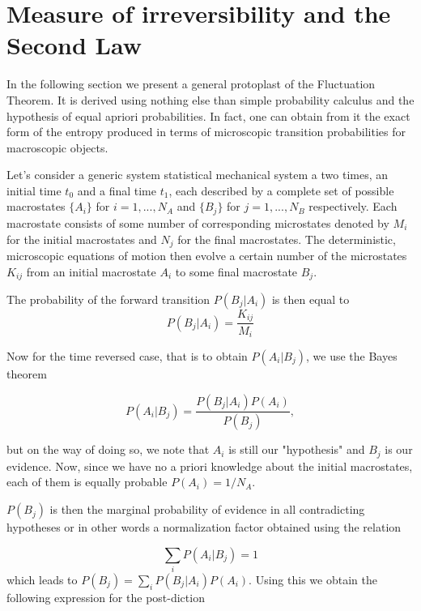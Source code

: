 \documentclass[a4paper,12pt]{article}
\begin{document}
\section{Measure of irreversibility and the Second Law}

In the following section we present a general protoplast of the Fluctuation Theorem. It is derived using nothing else than simple probability calculus and the hypothesis of equal apriori probabilities.
In fact, one can obtain from it the exact form of the entropy produced in terms of microscopic transition probabilities for macroscopic objects.

Let's consider a generic system statistical mechanical system a two times, an initial time $t_0$ and a final time $t_1$, each described by a complete set of possible macrostates $\{A_i\}$ for $ i=1,...,N_A $ and $\{B_j\}$ for $ j=1,...,N_B $  respectively. Each macrostate consists of some number of corresponding microstates denoted by $M_i$ for the initial macrostates and $N_j$ for the final macrostates. The deterministic, microscopic equations of motion then evolve a certain number of the microstates $K_{ij}$ from an initial macrostate $A_i$ to some final macrostate $B_j$.

The probability of the forward transition $P(B_j|A_i)$ is then equal to
\begin{equation}
  P(B_j|A_i)= \frac{K_{ij}}{M_i}
\end{equation}

Now for the time reversed case, that is to obtain $P(A_i|B_j)$, we use the Bayes theorem

\begin{equation}
  P(A_i|B_j)=\frac{P(B_j|A_i)P(A_i)}{P(B_j)},
\end{equation}

but on the way of doing so, we note that $A_i$ is still our "hypothesis" and $B_j$ is our evidence. Now, since we have no a priori knowledge about the initial macrostates, each of them is equally probable $P(A_i)= 1/N_A$.

$P(B_j)$ is then the marginal probability of evidence in all contradicting hypotheses or in other words a normalization factor obtained using the relation 

\begin{equation}
  \sum_i P(A_i|B_j) = 1
\end{equation}
which leads to $P(B_j) = \sum_i P(B_j|A_i)P(A_i)$. Using this we obtain the following expression for the post-diction
\end{document}

